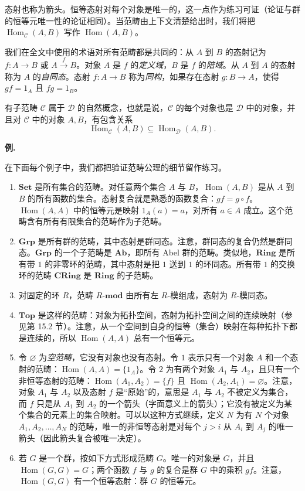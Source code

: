 态射也称为箭头。恒等态射对每个对象是唯一的，这一点作为练习可证（论证与群的恒等元唯一性的论证相同）。当范畴由上下文清楚给出时，我们将把 $\operatorname{Hom}_{\mathcal C}(A,B)$ 写作 $\operatorname{Hom}(A,B)$。

我们在全文中使用的术语对所有范畴都是共同的：从 $A$ 到 $B$ 的态射记为 $f:A\to B$ 或 $A\xrightarrow{f}B$。对象 $A$ 是 $f$ 的\emph{定义域}，$B$ 是 $f$ 的\emph{陪域}。从 $A$ 到 $A$ 的态射称为 $A$ 的\emph{自同态}。态射 $f:A\to B$ 称为\emph{同构}，如果存在态射 $g:B\to A$，使得 $gf=1_A$ 且 $fg=1_B$。

有子范畴 $\mathcal C$ 属于 $\mathcal D$ 的自然概念，也就是说，$\mathcal C$ 的每个对象也是 $\mathcal D$ 中的对象，并且对 $\mathcal C$ 中的对象 $A,B$，有包含关系
\[
  \operatorname{Hom}_{\mathcal C}(A,B)\subseteq \operatorname{Hom}_{\mathcal D}(A,B).
\]

\noindent\textbf{例.}

在下面每个例子中，我们都把验证范畴公理的细节留作练习。
\begin{enumerate}[label=(\arabic*)]
  \item $\mathbf{Set}$ 是所有集合的范畴。对任意两个集合 $A$ 与 $B$，$\operatorname{Hom}(A,B)$ 是从 $A$ 到 $B$ 的所有函数的集合。态射复合就是熟悉的函数复合：$gf=g\circ f$。$\operatorname{Hom}(A,A)$ 中的恒等元是映射 $1_A(a)=a$，对所有 $a\in A$ 成立。这个范畴含有所有有限集合的范畴作为子范畴。

  \item $\mathbf{Grp}$ 是所有群的范畴，其中态射是群同态。注意，群同态的复合仍然是群同态。$\mathbf{Grp}$ 的一个子范畴是 $\mathbf{Ab}$，即所有 Abel 群的范畴。类似地，$\mathbf{Ring}$ 是所有带 $1$ 的非零环的范畴，其中态射是把 $1$ 送到 $1$ 的环同态。所有带 $1$ 的交换环的范畴 $\mathbf{CRing}$ 是 $\mathbf{Ring}$ 的子范畴。

  \item 对固定的环 $R$，范畴 $R\text{-}\mathbf{mod}$ 由所有左 $R$-模组成，态射为 $R$-模同态。

  \item $\mathbf{Top}$ 是这样的范畴：对象为拓扑空间，态射为拓扑空间之间的连续映射（参见第 15.2 节）。注意，从一个空间到自身的恒等（集合）映射在每种拓扑下都是连续的，所以 $\operatorname{Hom}(A,A)$ 总有一个恒等元。

  \item 令 $\varnothing$ 为\emph{空范畴}，它没有对象也没有态射。令 $1$ 表示只有一个对象 $A$ 和一个态射的范畴：$\operatorname{Hom}(A,A)=\{1_A\}$。令 $2$ 为有两个对象 $A_1$ 与 $A_2$，且只有一个非恒等态射的范畴：$\operatorname{Hom}(A_1,A_2)=\{f\}$ 且 $\operatorname{Hom}(A_2,A_1)=\varnothing$。注意，对象 $A_1$ 与 $A_2$ 以及态射 $f$ 是“原始”的，意思是 $A_1$ 与 $A_2$ 不被定义为集合，而 $f$ 只是从 $A_1$ 到 $A_2$ 的一个箭头（字面意义上的箭头）；它没有被定义为某个集合的元素上的集合映射。可以以这种方式继续，定义 $N$ 为有 $N$ 个对象 $A_1,A_2,\ldots,A_N$ 的范畴，唯一的非恒等态射是对每个 $j>i$ 从 $A_i$ 到 $A_j$ 的唯一箭头（因此箭头复合被唯一决定）。

  \item 若 $G$ 是一个群，按如下方式形成范畴 $G$。唯一的对象是 $G$，并且 $\operatorname{Hom}(G,G)=G$；两个函数 $f$ 与 $g$ 的复合是群 $G$ 中的乘积 $gf$。注意，$\operatorname{Hom}(G,G)$ 有一个恒等态射：群 $G$ 的恒等元。
\end{enumerate}

